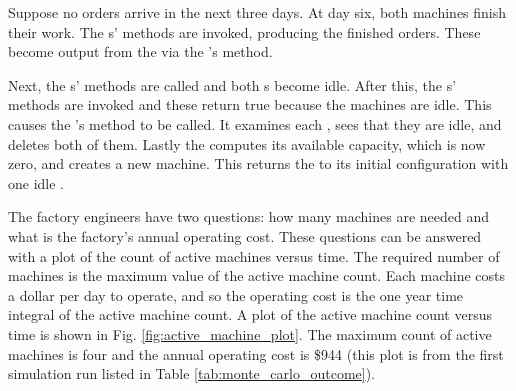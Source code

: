 Suppose no orders arrive in the next three days. At day six, both machines finish their work. The s'  methods are invoked, producing the finished orders. These become output from the  via the 's  method.

Next, the s'  methods are called and both s become idle. After this, the s'  methods are invoked and these return true because the machines are idle. This causes the 's  method to be called. It examines each , sees that they are idle, and deletes both of them. Lastly the  computes its available capacity, which is now zero, and creates a new machine. This returns the  to its initial configuration with one idle .
 
The factory engineers have two questions: how many machines are needed and what is the factory's annual operating cost. These questions can be answered with a plot of the count of active machines versus time. The required number of machines is the maximum value of the active machine count. Each machine costs a dollar per day to operate, and so the operating cost is the one year time integral of the active machine count. A plot of the active machine count versus time is shown in Fig. \ref{fig:active_machine_plot}. The maximum count of active machines is four and the annual operating cost is \$944 (this plot is from the first simulation run listed in Table \ref{tab:monte_carlo_outcome}). 

